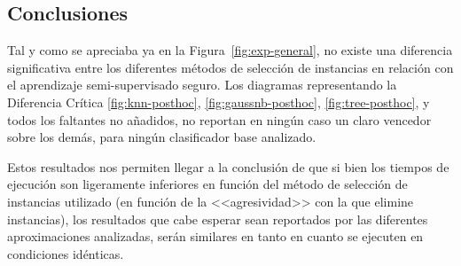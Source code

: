\FloatBarrier
\subsection{Conclusiones}
Tal y como se apreciaba ya en la Figura~\ref{fig:exp-general}, no existe una diferencia significativa entre los diferentes métodos de selección de instancias en relación con el aprendizaje semi-supervisado seguro. Los diagramas representando la Diferencia Crítica \ref{fig:knn-posthoc}, \ref{fig:gaussnb-posthoc}, \ref{fig:tree-posthoc}, y todos los faltantes no añadidos, no reportan en ningún caso un claro vencedor sobre los demás, para ningún clasificador base analizado. 

Estos resultados nos permiten llegar a la conclusión de que si bien los tiempos de ejecución son ligeramente inferiores en función del método de selección de instancias utilizado (en función de la <<agresividad>> con la que elimine instancias), los resultados que cabe esperar sean reportados por las diferentes aproximaciones analizadas, serán similares en tanto en cuanto se ejecuten en condiciones idénticas.


